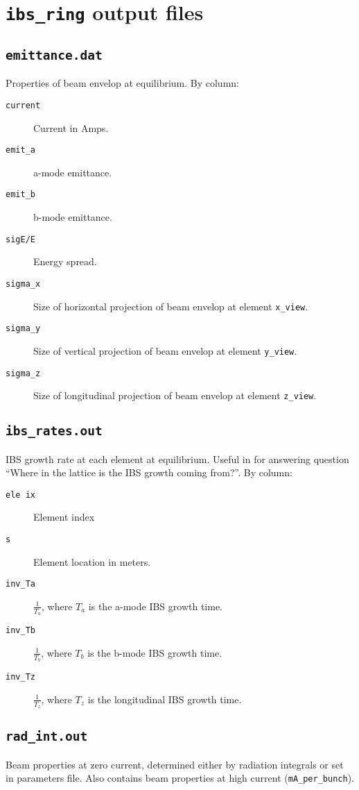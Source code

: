 \documentclass[11pt]{article}
\begin{document}
\section{{\tt ibs_ring} output files}

\subsection{{\tt emittance.dat}}
Properties of beam envelop at equilibrium.  By column:
\begin{description}
\item[{\tt current}] Current in Amps.
\item[{\tt emit_a}] a-mode emittance.
\item[{\tt emit_b}] b-mode emittance.
\item[{\tt sigE/E}] Energy spread.
\item[{\tt sigma_x}] Size of horizontal projection of beam envelop at element {\tt x_view}.
\item[{\tt sigma_y}] Size of vertical projection of beam envelop at element {\tt y_view}.
\item[{\tt sigma_z}] Size of longitudinal projection of beam envelop at element {\tt z_view}.
\end{description}

\subsection{{\tt ibs_rates.out}}
IBS growth rate at each element at equilibrium.  Useful in for answering question
``Where in the lattice is the IBS growth coming from?''.  By column:
\begin{description}
\item[{\tt ele ix}] Element index
\item[{\tt s}] Element location in meters.
\item[{\tt inv_Ta}] $\frac{1}{T_a}$, where $T_a$ is the a-mode IBS growth time.
\item[{\tt inv_Tb}] $\frac{1}{T_b}$, where $T_b$ is the b-mode IBS growth time.
\item[{\tt inv_Tz}] $\frac{1}{T_z}$, where $T_z$ is the longitudinal IBS growth time.
\end{description}

\subsection{{\tt rad_int.out}}
Beam properties at zero current, determined either by radiation integrals or set
in parameters file.  Also contains beam properties at high current ({\tt mA_per_bunch}).
\end{document}
